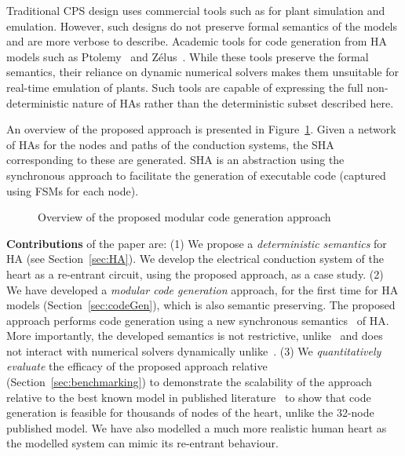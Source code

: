 {Traditional \ac{CPS} design uses commercial tools such as \simulink for plant simulation and emulation.
However, such designs do not preserve formal semantics of the models and are more verbose to describe.
Academic tools for code generation from \ac{HA} models such as Ptolemy~\cite{ptolemaeus2014system} and Z\'{e}lus~\cite{bourke13zelus}.
While these tools preserve the formal semantics, their reliance on dynamic numerical solvers makes them unsuitable for real-time emulation of plants.
Such tools are capable of expressing the full non-deterministic nature of \acp{HA} rather than the deterministic subset described here.}

   
 An overview of the proposed approach is presented
 in Figure~\ref{fig:overview}. Given a network
 of \acp{HA} for the nodes and paths of the conduction systems, the \ac{SHA} corresponding to these are generated. \ac{SHA} is an abstraction using the
synchronous approach to facilitate the generation of executable code (captured using \acp{FSM} for each node).
 
 \begin{figure}[bthp]
 	\centering
 	\scalebox{0.7}{
	 
	}
	 \caption{Overview of the proposed modular 
	 	code generation approach \label{fig:overview}}
\end{figure}
      
\textbf{Contributions} of the paper are:
(1) We propose a \emph{deterministic semantics} for \acf{HA} (see Section~\ref{sec:HA}).
We develop the electrical conduction system of the heart as a re-entrant circuit,
 using the proposed approach, as a case study.
(2) We have developed a \emph{modular code generation} approach, for the first time for \ac{HA} models (Section~\ref{sec:codeGen}), which is also semantic preserving.
The proposed approach performs code generation using a new synchronous semantics~\cite{benveniste03} of \ac{HA}. More importantly, the developed semantics is not restrictive, unlike~\cite{alur2003generating, kim2003modular} and does not interact with numerical solvers dynamically unlike~\cite{ptolemaeus2014system, bourke13zelus}.
(3) We \emph{quantitatively evaluate} the efficacy of the 
proposed approach relative \simulink (Section~\ref{sec:benchmarking}) to demonstrate the scalability of the approach relative to the 
 best known model in published literature~\cite{chen14} to show that code generation is feasible for thousands of nodes of the heart, unlike the 32-node published model. We have also modelled a much more realistic human heart as the modelled system can mimic its re-entrant behaviour.
 
